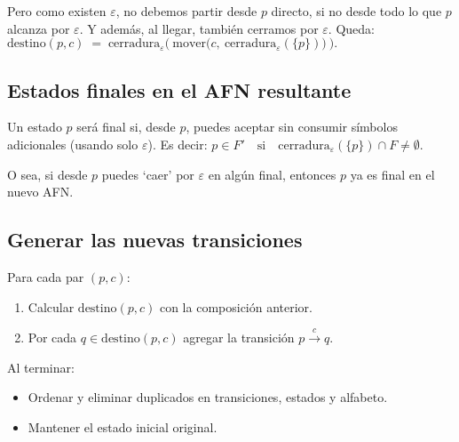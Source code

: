 Pero como existen $\varepsilon$, no debemos partir desde $p$ directo, si no desde todo lo que $p$ alcanza por $\varepsilon$. Y además, al llegar, también cerramos por $\varepsilon$. Queda:
$
\text{destino}(p, c) \;=\; \text{cerradura}_\varepsilon\Big(\ \text{mover}\big(c,\ \text{cerradura}_\varepsilon(\{p\})\big)\ \Big).
$

\subsection{Estados finales en el AFN resultante}
Un estado $p$ será final si, desde $p$, puedes aceptar sin consumir símbolos adicionales (usando solo $\varepsilon$). Es decir:
$
p \in F' \quad \text{si} \quad \text{cerradura}_\varepsilon(\{p\}) \cap F \neq \emptyset.
$

O sea, si desde $p$ puedes ‘caer’ por $\varepsilon$ en algún final, entonces $p$ ya es final en el nuevo AFN.

\subsection{Generar las nuevas transiciones}

Para cada par $(p, c)$:
\begin{enumerate}
    \item Calcular $\text{destino}(p, c)$ con la composición anterior.
    \item Por cada $q \in \text{destino}(p, c)$ agregar la transición $p \xrightarrow{c} q$.
\end{enumerate}
Al terminar:
\begin{itemize}
    \item Ordenar y eliminar duplicados en transiciones, estados y alfabeto.
    \item Mantener el estado inicial original.
\end{itemize}
